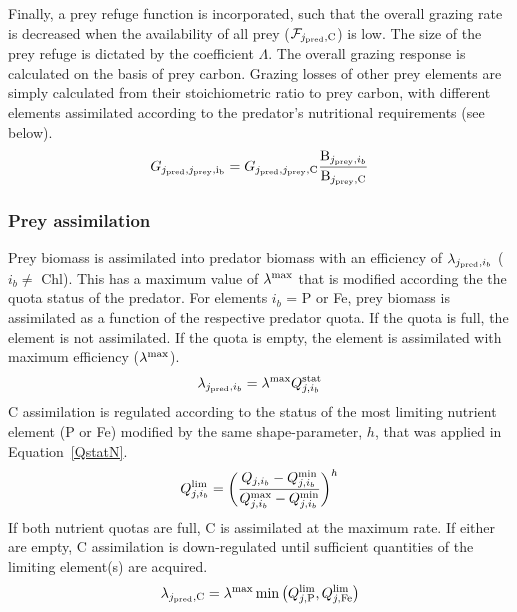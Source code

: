 \documentclass[gmd, manuscript]{copernicus}
\begin{document}
%
Finally, a prey refuge function is incorporated, such that the overall grazing rate is decreased when the availability of all prey ($\mathcal{F}_{j_{\rm pred},{\rm C}}$) is low. The size of the prey refuge is dictated by the coefficient $\Lambda$. The overall grazing response is calculated on the basis of prey carbon. Grazing losses of other prey elements are simply calculated from their stoichiometric ratio to prey carbon, with different elements assimilated according to the predator's nutritional requirements (see below).
%
\begin{equation}
G_{j_{\rm pred},j_{\rm prey},{\rm i_b}} = G_{j_{\rm pred},j_{\rm prey},{\rm C}} \frac{{\rm B}_{j_{\rm prey},i_b}}{{\rm B}_{j_{\rm prey},{\rm C}}}
\end{equation}
%

\subsubsection{Prey assimilation} 

Prey biomass is assimilated into predator biomass with an efficiency of $\lambda_{j_{\rm pred},i_b}$ ($i_b \ne $ Chl). This has a maximum value of $\lambda^{\rm max}$ that is modified according the the quota status of the predator. For elements $i_b$ = P or Fe, prey biomass is assimilated as a function of the respective predator quota. If the quota is full, the element is not assimilated. If the quota is empty, the element is assimilated with maximum efficiency ($\lambda^{\rm max}$). 
%
\begin{equation}
\lambda_{j_{\rm pred},i_b} = \lambda^{\rm max} Q_{j,i_b}^{\rm stat}
\end{equation}
%
C assimilation is regulated according to the status of the most limiting nutrient element (P or Fe) modified by the same shape-parameter, $h$, that was applied in Equation~\ref{QstatN}. 
%
\begin{equation}
Q_{j,i_b}^{\rm lim} = \bigg( \frac{Q_{j,i_b}-Q^{\rm min}_{j,i_b}}{Q_{j,i_b}^{\rm max}-Q_{j,i_b}^{\rm min}} \bigg)^h
\end{equation}
%
If both nutrient quotas are full, C is assimilated at the maximum rate. If either are empty, C assimilation is down-regulated until sufficient quantities of the limiting element(s) are acquired.
%
\begin{equation}
\lambda_{j_{\rm pred},{\rm C}} = \lambda^{\rm max} \min \big( Q_{j,{\rm P}}^{\rm lim}, Q_{j,{\rm Fe}}^{\rm lim} \big)
\end{equation}
%
\end{document}
